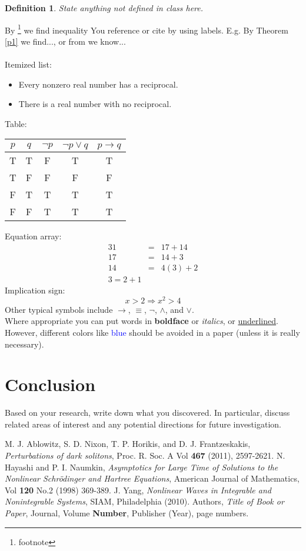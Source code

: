 \documentclass{article}
\newtheorem{definition}[theorem]{Definition}
\begin{document}
\begin{definition} State anything not defined in class here.
\end{definition}
By \footnote{footnote} we find inequality
You reference or cite by using labels. E.g. By Theorem \ref{p1} we find..., or from \cite{Y10} we know...\\
\\
Itemized list:
\begin{itemize}
\item Every nonzero real number has a reciprocal.
\item There is a real number with no reciprocal.
\end{itemize}
Table:
\begin{center}
\begin{tabular}{|c|c|c|c|c|} 
 \hline
 $p$ & $q$ & $\neg p$ & $\neg p\lor q$ & $p\to q$ \\ 
 \hline
 T & T & F & T & T \\
 T & F & F & F & F \\
 F & T & T & T & T \\
 F & F & T & T & T \\
 \hline
\end{tabular}
\end{center}
Equation array:
\begin{eqnarray*}
31&=&17+14\\
17&=&14+3\\
14&=&4(3)+2\\
3=2+1
\end{eqnarray*}
Implication sign:
$$x>2\Longrightarrow x^2>4$$
Other typical symbols include $\to$, $\equiv$, $\neg$, $\land$, and $\lor$.\\

Where appropriate you can put words in \textbf{boldface} or \textit{italics}, or \underline{underlined}. However, different colors like \textcolor{blue}{blue} should be avoided in a paper (unless it is really necessary).

\section{Conclusion}

Based on your research, write down what you discovered. In particular, discuss related areas of interest and any potential directions for future investigation.


\begin{thebibliography}{99}
M. J. Ablowitz, S. D. Nixon, T. P. Horikis, and D. J. Frantzeskakis, \emph{Perturbations of dark solitons}, Proc. R. Soc. A Vol \textbf{467} (2011), 2597-2621.
N. Hayashi and P. I. Naumkin, \emph{Asymptotics for Large Time of Solutions to the Nonlinear Schr\"odinger and Hartree Equations}, American Journal of Mathematics, Vol \textbf{120} No.2 (1998) 369-389.
J. Yang, \emph{Nonlinear Waves in Integrable and Nonintegrable Systems}, SIAM, Philadelphia (2010).
Authors, \emph{Title of Book or Paper}, Journal, Volume \textbf{Number}, Publisher (Year), page numbers.
\end{thebibliography}
\end{document}
